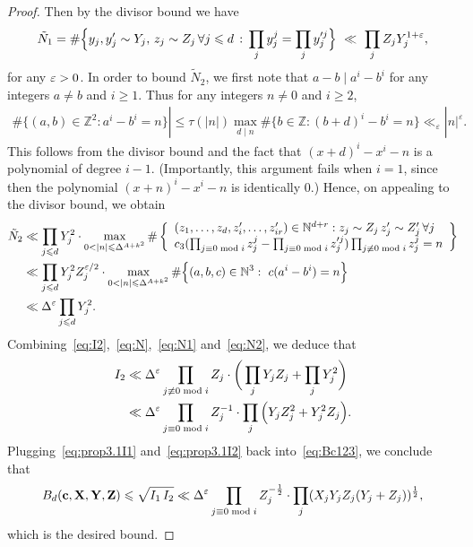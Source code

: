 \begin{proof}
  Then by the divisor bound we have
  \begin{align}\label{eq:N1}
  \tilde{N}_1= \#\Big\{ y_j, y_j'\sim Y_j,\,z_j \sim Z_j\,\forall j\leqslant d\,:\, \prod_{j}y_j^j=\prod_{j}y_j'^j\Big\} \ \ll \ \prod_j Z_j Y_j^{1+\varepsilon},
  \end{align}
  for any $\varepsilon>0$. In order to bound $\tilde{N}_2$, we first note that $a-b\mid a^i-b^i$ for any integers $a\neq b$ and $i\geq 1$. Thus for any integers $n\neq 0$ and $i\geq 2$,
  \begin{align*}
  \#\{(a,b)\in \mathbb{Z}^2:a^i-b^i=n\}|\leq \tau(|n|)\max_{d\mid n}\#\{b\in \mathbb{Z}:(b+d)^i-b^i=n\}\ll_{\varepsilon} |n|^{\varepsilon}.
  \end{align*}
  This follows from the divisor bound and the fact that $(x+d)^i-x^i-n$ is a polynomial of degree $i-1$. (Importantly, this argument fails when $i=1$, since then the polynomial $(x+n)^i-x^i-n$ is identically $0$.)
  Hence, on appealing to the divisor bound, we obtain
  \begin{align}\label{eq:N2}\begin{split}
  \tilde{N}_2&\ll \prod_{j\leq d}Y_j^2\cdot \max_{0<|n|\leq \Delta^{A+k^2}}\#\left\{
  \begin{array}{l}
  (z_1,\ldots,z_d,z_i',\ldots, z_{ir}')\in \mathbb{N}^{d+r}:
  z_j \sim Z_j\,z_j' \sim Z_j'\, \forall j\\
  c_3(\prod_{j\equiv 0\bmod i}z_j^j-\prod_{j\equiv 0\bmod i}z_j'^j)\prod_{j\not \equiv 0\bmod i}z_{j}^j=n
  \end{array}\right\}\\
  &\ll \prod_{j\leq d}Y_j^2Z_j^{\eps/2}\cdot \max_{0<|n|\leq \Delta^{A+k^2}}\#\Big\{(a,b,c)\in \mathbb{N}^{3}:\,\, c(a^i-b^i)=n \Big\}\\
  &\ll \Delta^\eps\prod_{j\leq d}Y_j^{2}.
  \end{split}
  \end{align}
  Combining~\eqref{eq:I2},~\eqref{eq:N},~\eqref{eq:N1} and~\eqref{eq:N2}, we deduce that
  \begin{equation}
  \begin{split}
  \label{eq:prop3.1I2}
  I_2 &\ll \Delta^\varepsilon \prod_{j\not \equiv 0\bmod i}Z_{j} \cdot\bigg(\prod_j Y_j Z_j + \prod_{j}
  Y_j^2 \bigg) \\
  &\ll \Delta^\varepsilon \prod_{j\equiv 0\bmod i}Z_j^{-1}\cdot \prod_{j}\Big(Y_j Z_j^{2} + Y_j^2Z_j\Big).
  \end{split}\end{equation}
  Plugging~\eqref{eq:prop3.1I1} and~\eqref{eq:prop3.1I2} back into~\eqref{eq:Bc123}, we conclude that
  \begin{align*}
  B_d(\mathbf{c},\mathbf{X},\mathbf{Y},\mathbf{Z}) \leqslant \sqrt{I_1\,I_2}\ll \Delta^\varepsilon \prod_{j\equiv 0\bmod i}Z_j^{-\frac{1}{2}}\cdot \prod_{j}(X_j Y_j Z_j(Y_j+Z_j))^{\frac{1}{2}},
  \end{align*}
  which is the desired bound.
\end{proof}


